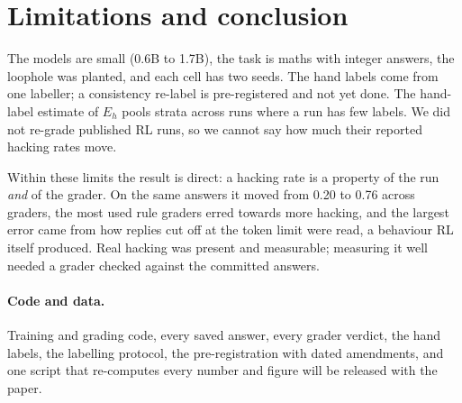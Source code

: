 \documentclass[10pt]{article}
\newcommand{\E}{E}
\begin{document}
\section{Limitations and conclusion}
The models are small (0.6B to 1.7B), the task is maths with integer answers, the loophole was planted, and
each cell has two seeds. The hand labels come from one labeller; a consistency re-label is pre-registered
and not yet done. The hand-label estimate of $\E_h$ pools strata across runs where a run has few labels.
We did not re-grade published RL runs, so we cannot say how much their reported hacking rates move.

Within these limits the result is direct: a hacking rate is a property of the run \emph{and} of the grader.
On the same answers it moved from 0.20 to 0.76 across graders, the most used rule graders erred towards
more hacking, and the largest error came from how replies cut off at the token limit were read, a
behaviour RL itself produced. Real hacking was present and measurable; measuring it well needed a
grader checked against the committed answers.

\paragraph{Code and data.} Training and grading code, every saved answer, every grader verdict, the hand
labels, the labelling protocol, the pre-registration with dated amendments, and one script that
re-computes every number and figure will be released with the paper.
\end{document}
